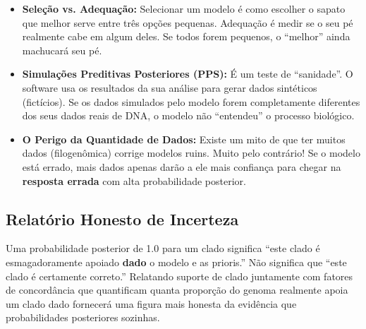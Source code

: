 \begin{tcolorbox}[
    colback=red!5!white, 
    colframe=red!75!black, 
    title=\textbf{O Problema da Adequação do Modelo (\textit{Model Adequacy})},
    arc=2mm
]
\begin{itemize}
    \item \textbf{Seleção vs. Adequação:} Selecionar um modelo é como escolher o sapato que melhor serve entre três opções pequenas. Adequação é medir se o seu pé realmente cabe em algum deles. Se todos forem pequenos, o ``melhor'' ainda machucará seu pé.
    \item \textbf{Simulações Preditivas Posteriores (PPS):} É um teste de ``sanidade''. O software usa os resultados da sua análise para gerar dados sintéticos (fictícios). Se os dados simulados pelo modelo forem completamente diferentes dos seus dados reais de DNA, o modelo não ``entendeu'' o processo biológico.
    \item \textbf{O Perigo da Quantidade de Dados:} Existe um mito de que ter muitos dados (filogenômica) corrige modelos ruins. Muito pelo contrário! Se o modelo está errado, mais dados apenas darão a ele mais confiança para chegar na \textbf{resposta errada} com alta probabilidade posterior.
\end{itemize}
\end{tcolorbox}

\subsection{Relatório Honesto de Incerteza}

Uma probabilidade posterior de 1.0 para um clado significa ``este clado é esmagadoramente apoiado \textbf{dado} o modelo e as prioris.'' Não significa que ``este clado é certamente correto.'' Relatando suporte de clado juntamente com fatores de concordância que quantificam quanta proporção do genoma realmente apoia um clado dado fornecerá uma figura mais honesta da evidência que probabilidades posteriores sozinhas.

